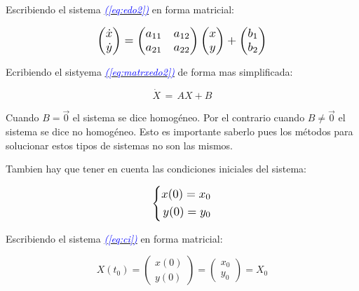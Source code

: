\documentclass[12pt,a4paper]{report} %
\newcommand{\eref}[1]{\hyperref[#1]{\textcolor{blue}{\textit{(\ref*{#1})}}}}
\begin{document}
	Escribiendo el sistema \eref{eq:edo2} en forma matricial:
	
	\begin{equation}
		\label{eq:matrxedo2}
		\scalebox{1.2}{$\displaystyle
		\begin{pmatrix}
			\dot{x}\\
			\dot{y}\\
		\end{pmatrix} =
		\begin{pmatrix}
			a_{11} & a_{12}\\
		    a_{21} & a_{22}\\
		\end{pmatrix} 
		\begin{pmatrix}
			x\\
			y\\
		\end{pmatrix} + 
		\begin{pmatrix}
			b_1\\
			b_2\\
		\end{pmatrix}
		$}
	\end{equation} \smallskip
	
	Ecribiendo el sistyema \eref{eq:matrxedo2} de forma mas simplificada:
	
	\begin{equation}
		\dot{X}\,=\,AX+B
	\end{equation}\smallskip
	
	Cuando $B=\vec{0}$ el sistema se dice homogéneo. Por el contrario cuando $B\neq\vec{0}$ el sistema se dice no homogéneo. Esto es importante saberlo pues los métodos para solucionar estos tipos de sistemas no son las mismos.
	
	Tambien hay que tener en cuenta las condiciones iniciales del sistema:
	
	\begin{equation}
		\label{eq:ci}
		\scalebox{1.2}{$\displaystyle
			\left\{
			\begin{aligned}
				x(0)=x_0 \\
			    y(0)=y_0
			\end{aligned}
			\right.
			$}
	\end{equation}\smallskip
	
	Escribiendo el sistema \eref{eq:ci} en forma matricial:
	
	\begin{equation}
		\label{cimat}
		X(t_0)=\begin{pmatrix}
			x(0)\\y(0)
		\end{pmatrix}=\begin{pmatrix}
		x_0\\y_0
		\end{pmatrix}=X_0
	\end{equation}\smallskip
	
\end{document}
